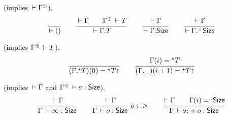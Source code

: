 \documentclass[acmlarge,review,anonymous]{acmart}\settopmatter{printfolios=true}
\begin{document}
\fbox{$\der \Gamma$} (implies $\der \resurrect \Gamma$).
\[
  \ru{}{\der \cempty}
\qquad
  \ru{\der \Gamma \qquad
      \resurrect \Gamma \der T
    }{\der \cext \Gamma T}
\qquad
  \ru{\der \Gamma
    }{\der \cext \Gamma \Size}
\qquad
  \ru{\der \Gamma
    }{\der \erext \Gamma \Size}
\]

 (implies $\resurrect\Gamma \der T$).
\[
  \ru{}{(\eext \Gamma T)(0) = \eann T \slift}
\qquad
  \ru{\Gamma(i) = \eann T
    }{(\cext \Gamma \_)(i+1) = \eann T \slift}
\]

  (implies $\der \Gamma$ and $\resurrect \Gamma \der a : \Size$).
\[
  \ru{\der \Gamma}{\Gamma \der \infty : \Size}
\qquad
  \rux{\der \Gamma}{\Gamma \der o : \Size}{o \in \NN}
\qquad
  \ru{\der \Gamma \qquad \Gamma(i) = \erann[\noterased]\Size
    }{\Gamma \der \ind i + o : \Size
    }
\]
\end{document}
